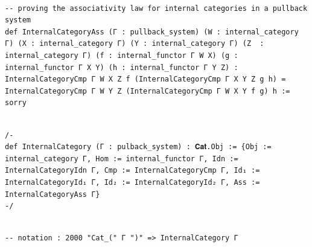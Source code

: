 \documentclass{book}
\theoremstyle{definition}
\newcounter{lcounter}
\begin{document}
\begin{center}
\begin{tcolorbox}[width=5in,colback={white},title={\begin{center}\texttt{Lean \thelcounter} \addtocounter{lcounter}{1}  \end{center}},colbacktitle=Blue,coltitle=black]
\begin{verbatim}

-- proving the associativity law for internal categories in a pullback system
def InternalCategoryAss (Γ : pullback_system) (W : internal_category Γ) (X : internal_category Γ) (Y : internal_category Γ) (Z  : internal_category Γ) (f : internal_functor Γ W X) (g : internal_functor Γ X Y) (h : internal_functor Γ Y Z) : InternalCategoryCmp Γ W X Z f (InternalCategoryCmp Γ X Y Z g h) = InternalCategoryCmp Γ W Y Z (InternalCategoryCmp Γ W X Y f g) h := sorry

\end{verbatim}
\end{tcolorbox}
\end{center}

\begin{center}
\begin{tcolorbox}[width=5in,colback={white},title={\begin{center}\texttt{Lean \thelcounter} \addtocounter{lcounter}{1}  \end{center}},colbacktitle=Blue,coltitle=black]
\begin{verbatim}

/-
def InternalCategory (Γ : pulback_system) : 𝐂𝐚𝐭.Obj := {Obj := internal_category Γ, Hom := internal_functor Γ, Idn := InternalCategoryIdn Γ, Cmp := InternalCategoryCmp Γ, Id₁ := InternalCategoryId₁ Γ, Id₂ := InternalCategoryId₂ Γ, Ass := InternalCategoryAss Γ}
-/

\end{verbatim}
\end{tcolorbox}
\end{center}

\begin{center}
\begin{tcolorbox}[width=5in,colback={white},title={\begin{center}\texttt{Lean \thelcounter} \addtocounter{lcounter}{1}  \end{center}},colbacktitle=Blue,coltitle=black]
\begin{verbatim}

-- notation : 2000 "Cat_(" Γ ")" => InternalCategory Γ

\end{verbatim}
\end{tcolorbox}
\end{center}
\end{document}
